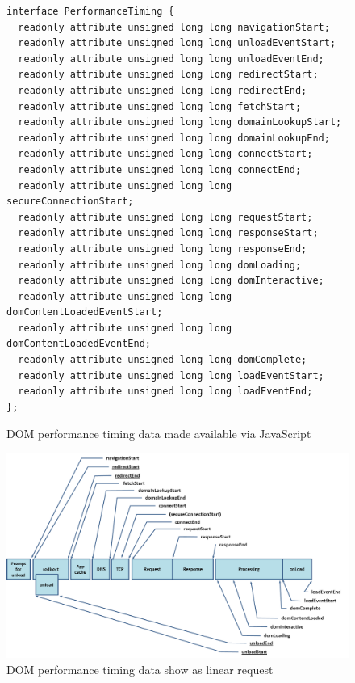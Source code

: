 \documentclass[12pt]{report}
\begin{document}
\begin{figure}[H]
\label{fig:performanceTimingData}
\begin{lstlisting}
interface PerformanceTiming {
  readonly attribute unsigned long long navigationStart;
  readonly attribute unsigned long long unloadEventStart;
  readonly attribute unsigned long long unloadEventEnd;
  readonly attribute unsigned long long redirectStart;
  readonly attribute unsigned long long redirectEnd;
  readonly attribute unsigned long long fetchStart;
  readonly attribute unsigned long long domainLookupStart;
  readonly attribute unsigned long long domainLookupEnd;
  readonly attribute unsigned long long connectStart;
  readonly attribute unsigned long long connectEnd;
  readonly attribute unsigned long long secureConnectionStart;
  readonly attribute unsigned long long requestStart;
  readonly attribute unsigned long long responseStart;
  readonly attribute unsigned long long responseEnd;
  readonly attribute unsigned long long domLoading;
  readonly attribute unsigned long long domInteractive;
  readonly attribute unsigned long long domContentLoadedEventStart;
  readonly attribute unsigned long long domContentLoadedEventEnd;
  readonly attribute unsigned long long domComplete;
  readonly attribute unsigned long long loadEventStart;
  readonly attribute unsigned long long loadEventEnd;
};
\end{lstlisting}
\caption{DOM performance timing data made available via JavaScript \cite{w3cNavigationTiming}}
\end{figure}


\begin{figure}[H]
\caption{DOM performance timing data show as linear request \cite{w3cNavigationTiming}}
\label{fig:performanceTimingChart}
\centering
\includegraphics[width=150mm]{figures/images/timing_overview.png}
\end{figure}
\end{document}
